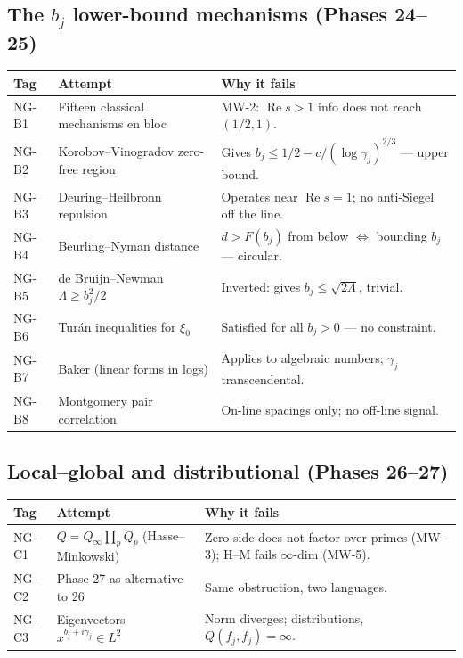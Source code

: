 \documentclass[11pt]{amsart}
\theoremstyle{definition}
\theoremstyle{remark}
\begin{document}
\subsection{The $b_j$ lower-bound mechanisms (Phases 24--25)}
\begin{longtable}{l p{5.4cm} p{6.4cm}}
\toprule \textbf{Tag} & \textbf{Attempt} & \textbf{Why it fails} \\ \midrule \endhead
NG-B1 & Fifteen classical mechanisms en bloc & MW-2: $\operatorname{Re}s>1$ info does not reach $(1/2,1)$. \\
NG-B2 & Korobov--Vinogradov zero-free region & Gives $b_j\le1/2-c/(\log\gamma_j)^{2/3}$ --- upper bound. \\
NG-B3 & Deuring--Heilbronn repulsion & Operates near $\operatorname{Re}s=1$; no anti-Siegel off the line. \\
NG-B4 & Beurling--Nyman distance & $d>F(b_j)$ from below $\iff$ bounding $b_j$ --- circular. \\
NG-B5 & de Bruijn--Newman $\Lambda\ge b_j^2/2$ & Inverted: gives $b_j\le\sqrt{2\Lambda}$, trivial. \\
NG-B6 & Tur\'an inequalities for $\xi_0$ & Satisfied for all $b_j>0$ --- no constraint. \\
NG-B7 & Baker (linear forms in logs) & Applies to algebraic numbers; $\gamma_j$ transcendental. \\
NG-B8 & Montgomery pair correlation & On-line spacings only; no off-line signal. \\
\bottomrule
\end{longtable}

\subsection{Local--global and distributional (Phases 26--27)}
\begin{longtable}{l p{5.4cm} p{6.4cm}}
\toprule \textbf{Tag} & \textbf{Attempt} & \textbf{Why it fails} \\ \midrule \endhead
NG-C1 & $Q=Q_\infty\prod_pQ_p$ (Hasse--Minkowski) & Zero side does not factor over primes (MW-3); H--M fails $\infty$-dim (MW-5). \\
NG-C2 & Phase 27 as alternative to 26 & Same obstruction, two languages. \\
NG-C3 & Eigenvectors $x^{b_j+i\gamma_j}\in L^2$ & Norm diverges; distributions, $Q(f_j,f_j)=\infty$. \\
\bottomrule
\end{longtable}
\end{document}
